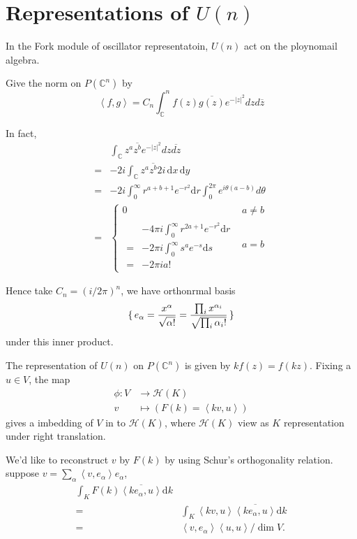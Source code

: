 \documentclass[12pt]{article}
\def\bC{{\mathbb{C}}}
\def\sH{\mathcal{H}}
\def\inn#1#2{\left\langle{#1},{#2}\right\rangle}
\def\abs#1{\left|{#1}\right|}
\begin{document}
\section{Representations of $U(n)$}
In the Fork module of oscillator representatoin,  
$U(n)$ act on the ploynomail algebra. 


Give the norm on $P(\bC^n)$ by
\[
\inn{f}{g} = C_n\int_\bC^nf(z)\overline{g(z)}e^{-\abs{z}^2}dzd\overline{z}
\]

\def\dd{\mathrm{d}}

In fact, 
\[
\begin{split}
 &\int_\bC z^a \overline{z^b} e^{-\abs{z}^2}dz\overline{dz} \\
=& -2i \int_\bC z^a \overline{z^b} 2i\,\dd x\,\dd y\\
=& -2i\int_{0}^\infty r^{a+b+1}e^{-r^2}\dd r \int_0^{2\pi} e^{i\theta(a-b)}d\theta\\
=& \begin{cases}
0 & a\neq b\\
\begin{split}
 &-4\pi i\int_0^\infty r^{2a+1} e^{-r^2} \dd r \\
=& -2\pi i \int_0^\infty s^a e^{-s}\dd s \\
=& -2\pi i a! 
\end{split}
& a=b 
\end{cases}
\end{split}
\]

Hence take $C_n = (i/2\pi)^n$, we have orthonrmal basis 
\[
\set{e_\alpha = \frac{x^\alpha}{\sqrt{\alpha!}}=\frac{\prod_i x^{\alpha_i}}{\sqrt{\prod_i \alpha_i!}}}
\]
under this inner product.

The representation of $U(n)$ on $P(\bC^n)$ is given by  $k f(z)  =f(kz)$. 
Fixing a $u\in V$, the map 
\begin{align*}
\phi\colon V &\to  \sH(K)\\
v & \mapsto (F(k)=\inn{kv}{u})
\end{align*}
gives a imbedding of $V$ in to $\sH(K)$, 
where $\sH(K)$ view as $K$ representation under right translation.

We'd like to reconstruct $v$ by $F(k)$ by using Schur's orthogonality relation. 
suppose $v = \sum_{\alpha} \inn{v}{e_\alpha} e_\alpha$, 
\[
\begin{split}
\int_K F(k) \overline{\inn{ke_\alpha}{u}} \dd k \\
= &\int_K  \inn{kv}{u}\overline{\inn{ke_\alpha}{u}}\dd k\\
= &\inn{v}{e_\alpha}\inn{u}{u}/\dim V.
\end{split}
\]
\end{document}
